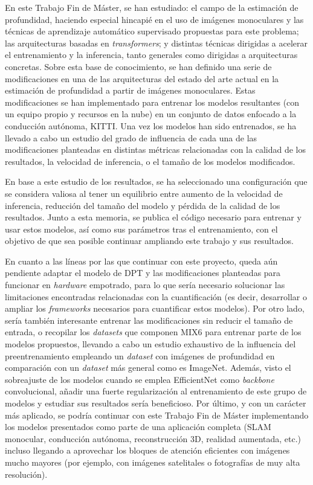 En este Trabajo Fin de Máster, se han estudiado: el campo de la estimación de profundidad, haciendo especial hincapié en el uso de imágenes monoculares y las técnicas de aprendizaje automático supervisado propuestas para este problema; las arquitecturas basadas en \textit{transformers}; y distintas técnicas dirigidas a acelerar el entrenamiento y la inferencia, tanto generales como dirigidas a arquitecturas concretas. Sobre esta base de conocimiento, se han definido una serie de modificaciones en una de las arquitecturas del estado del arte actual en la estimación de profundidad a partir de imágenes monoculares. Estas modificaciones se han implementado para entrenar los modelos resultantes (con un equipo propio y recursos en la nube) en un conjunto de datos enfocado a la conducción autónoma, KITTI. Una vez los modelos han sido entrenados, se ha llevado a cabo un estudio del grado de influencia de cada una de las modificaciones planteadas en distintas métricas relacionadas con la calidad de los resultados, la velocidad de inferencia, o el tamaño de los modelos modificados. 

En base a este estudio de los resultados, se ha seleccionado una configuración que se considera valiosa al tener un equilibrio entre aumento de la velocidad de inferencia, reducción del tamaño del modelo y pérdida de la calidad de los resultados. Junto a esta memoria, se publica el código necesario para entrenar y usar estos modelos, así como sus parámetros tras el entrenamiento, con el objetivo de que sea posible continuar ampliando este trabajo y sus resultados.

En cuanto a las líneas por las que continuar con este proyecto, queda aún pendiente adaptar el modelo de DPT y las modificaciones planteadas para funcionar en \textit{hardware} empotrado, para lo que sería necesario solucionar las limitaciones encontradas relacionadas con la cuantificación (es decir, desarrollar o ampliar los \textit{frameworks} necesarios para cuantificar estos modelos). Por otro lado, sería también interesante entrenar las modificaciones sin reducir el tamaño de entrada, o recopilar los \textit{datasets} que componen MIX6 para entrenar parte de los modelos propuestos, llevando a cabo un estudio exhaustivo de la influencia del preentrenamiento empleando un \textit{dataset} con imágenes de profundidad en comparación con un \textit{dataset} más general como es ImageNet. Además, visto el sobreajuste de los modelos cuando se emplea EfficientNet como \textit{backbone} convolucional, añadir una fuerte regularización al entrenamiento de este grupo de modelos y estudiar sus resultados sería beneficioso. Por último, y con un carácter más aplicado, se podría continuar con este Trabajo Fin de Máster implementando los modelos presentados como parte de una aplicación completa (SLAM monocular, conducción autónoma, reconstrucción 3D, realidad aumentada, etc.) incluso llegando a aprovechar los bloques de atención eficientes con imágenes mucho mayores (por ejemplo, con imágenes satelitales o fotografías de muy alta resolución).

